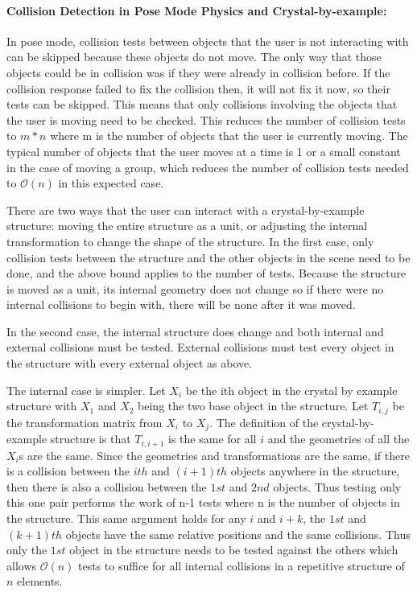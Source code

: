 \documentclass[twocolumn]{bmcart}%
\begin{document}
\paragraph*{Collision Detection in Pose Mode Physics and Crystal-by-example:}
In pose mode, collision tests between objects that the user is not interacting with can be skipped because these objects do not move.
The only way that those objects could be in collision was if they were already in collision before.
If the collision response failed to fix the collision then, it will not fix it now, so their tests can be skipped.
This means that only collisions involving the objects that the user is moving need to be checked.
This reduces the number of collision tests to $m*n$ where m is the number of objects that the user is currently moving.
The typical number of objects that the user moves at a time is 1 or a small constant in the case of moving a group, which reduces the number of collision tests needed to $\mathcal{O}(n)$ in this expected case.

There are two ways that the user can interact with a crystal-by-example structure: moving the entire structure as a unit, or adjusting the internal transformation to change the shape of the structure.
In the first case, only collision tests between the structure and the other objects in the scene need to be done, and the above bound applies to the number of tests.
Because the structure is moved as a unit, its internal geometry does not change so if there were no internal collisions to begin with, there will be none after it was moved. 


In the second case, the internal structure does change and both internal and external collisions must be tested.
External collisions must test every object in the structure with every external object as above.

The internal case is simpler.  Let $X_i$ be the ith object in the crystal by example structure with $X_1$ and $X_2$ being the two base object in the structure.
Let $T_{i,j}$ be the transformation matrix from $X_i$ to $X_j$.
The definition of the crystal-by-example structure is that $T_{i,i+1}$ is the same for all $i$ and the geometries of all the $X_i$s are the same.
Since the geometries and transformations are the same, if there is a collision between the $ith$ and $(i+1)th$ objects anywhere in the structure, then there is also a collision between the $1st$ and $2nd$ objects.
Thus testing only this one pair performs the work of n-1 tests where n is the number of objects in the structure.
This same argument holds for any $i$ and $i+k$, the $1st$ and $(k+1)th$ objects have the same relative positions and the same collisions.
Thus only the $1st$ object in the structure needs to be tested against the others which allows $\mathcal{O}(n)$ tests to suffice for all internal collisions in a repetitive structure of $n$ elements.
\end{document}
